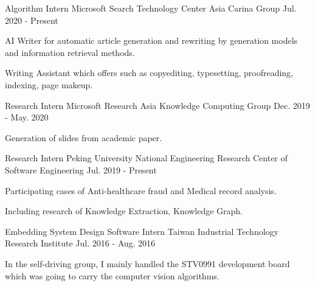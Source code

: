 

\begin{cventries}

  \cventry
    {Algorithm Intern} %
    {Microsoft Search Technology Center Asia Carina Group} %
    {} %
    {Jul. 2020 - Present} %
    {
      \begin{cvitems} %
        \item {AI Writer for automatic article generation and rewriting by generation models and information retrieval methods.}
        \item {Writing Assistant which offers such as copyediting, typesetting, proofreading, indexing, page makeup.}
      \end{cvitems}
    }

  \cventry
    {Research Intern} %
    {Microsoft Research Asia Knowledge Computing Group} %
    {} %
    {Dec. 2019 - May. 2020} %
    {
      \begin{cvitems} %
        \item {Generation of slides from academic paper.}
      \end{cvitems}
    }

  \cventry
    {Research Intern} %
    {Peking University National Engineering Research Center of Software Engineering} %
    {} %
    {Jul. 2019 - Present} %
    {
      \begin{cvitems} %
        \item {Participating cases of Anti-healthcare fraud and Medical record analysis.}
        \item {Including research of Knowledge Extraction, Knowledge Graph.}
      \end{cvitems}
    }

  \cventry
    {Embedding System Design Software Intern} %
    {Taiwan Industrial Technology Research Institute} %
    {} %
    {Jul. 2016 - Aug. 2016} %
    {
      \begin{cvitems} %
        \item {In the self-driving group, I mainly handled the STV0991 development board which was going to carry the computer vision algorithms.}
      \end{cvitems}
    }

\end{cventries}
